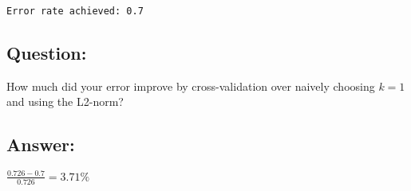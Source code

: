 \documentclass[11pt]{article}
\begin{document}
    \begin{Verbatim}[commandchars=\\\{\}]
Error rate achieved: 0.7

    \end{Verbatim}

    \subsection{Question:}\label{question}

How much did your error improve by cross-validation over naively
choosing \(k=1\) and using the L2-norm?

    \subsection{Answer:}\label{answer}

\(\frac{0.726 - 0.7}{0.726} = 3.71\%\)


    
    
    
    
\end{document}
